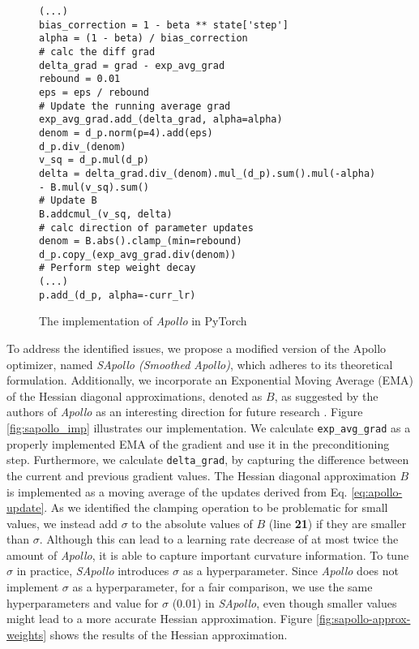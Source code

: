 \begin{figure}[H]
\begin{verbatim}
(...)
bias_correction = 1 - beta ** state['step']
alpha = (1 - beta) / bias_correction
# calc the diff grad
delta_grad = grad - exp_avg_grad
rebound = 0.01
eps = eps / rebound
# Update the running average grad
exp_avg_grad.add_(delta_grad, alpha=alpha)
denom = d_p.norm(p=4).add(eps)
d_p.div_(denom)
v_sq = d_p.mul(d_p)
delta = delta_grad.div_(denom).mul_(d_p).sum().mul(-alpha) 
- B.mul(v_sq).sum()
# Update B
B.addcmul_(v_sq, delta)
# calc direction of parameter updates
denom = B.abs().clamp_(min=rebound)
d_p.copy_(exp_avg_grad.div(denom))
# Perform step weight decay
(...)
p.add_(d_p, alpha=-curr_lr)
\end{verbatim}
    \caption{The implementation of \emph{Apollo} in PyTorch}
    \label{fig:apollo_imp}
    \end{figure}
    To address the identified issues, we propose a modified version of the Apollo optimizer, named \emph{SApollo (Smoothed Apollo)}, which adheres to its theoretical formulation. Additionally, we incorporate an Exponential Moving Average (EMA) of the Hessian diagonal approximations, denoted as $B$, as suggested by the authors of \emph{Apollo} as an interesting direction for future research \cite{apollo}.
    Figure \ref{fig:sapollo_imp} illustrates our implementation. We calculate \texttt{exp\_avg\_grad} as a properly implemented EMA of the gradient and use it in the preconditioning step.
    Furthermore, we calculate \texttt{delta\_grad}, by capturing the difference between the current and previous gradient values.
    The Hessian diagonal approximation $B$ is implemented as a moving average of the updates derived from Eq. \ref{eq:apollo-update}.
    As we identified the clamping operation to be problematic for small values, we instead add $\sigma$ to the absolute values of $B$ (line \textbf{21}) if they are smaller than $\sigma$.
    Although this can lead to a learning rate decrease of at most twice the amount of \emph{Apollo}, it is able to capture
    important curvature information. To tune $\sigma$ in practice, \emph{SApollo} introduces $\sigma$ as a hyperparameter.
    Since \emph{Apollo} does not implement $\sigma$ as a hyperparameter, for a fair comparison, we use the same hyperparameters and  value for $\sigma$ (0.01) in \emph{SApollo}, even though smaller values might lead to a more accurate Hessian approximation.
    Figure \ref{fig:sapollo-approx-weights} shows the results of the Hessian approximation. 

